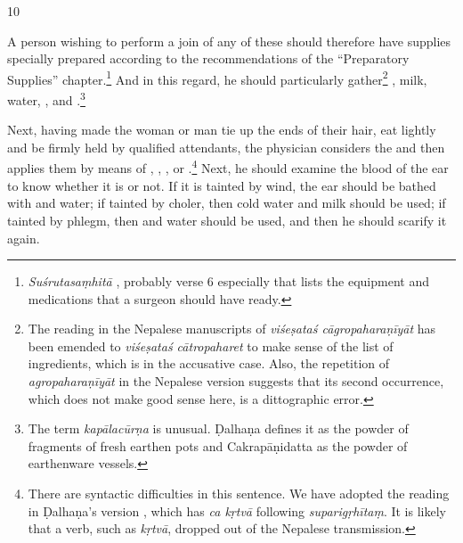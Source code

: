 \begin{translation}
\item[10]  
    
A person wishing to perform a join of any of these should therefore have supplies
specially prepared according to the recommendations of the “Preparatory Supplies”
chapter.\footnote{\emph{Suśrutasaṃhitā} , probably verse 6
    especially that lists the equipment and medications that a surgeon should have
    ready.}  And in this regard, he should particularly gather\footnote{The reading in
        the Nepalese manuscripts of \emph{viśeṣataś cāgropaharaṇīyāt} has been emended to
        \emph{viśeṣataś cātropaharet} to make sense of the list of ingredients, which is
        in the accusative case. Also, the repetition of \emph{agropaharaṇīyāt} in the
        Nepalese version suggests that its second occurrence, which does not make good
        sense here, is a dittographic error.} , milk,
        water, , and .\footnote{The term \emph{kapālacūrṇa} is unusual. Ḍalhaṇa
            \citep[79]{vulgate} defines it as the powder of fragments of fresh earthen pots
            and Cakrapāṇidatta \citep[129]{acar-1939} as the powder of earthenware vessels.}
    
Next, having made the woman or man tie up the ends of their hair, eat lightly and
be firmly held by qualified attendants, the physician considers the
 and then applies them by means of ,
, , or
.\footnote{There are syntactic difficulties in this
    sentence.  We have %
    adopted the reading in Ḍalhaṇa's version \citep[78]{vulgate}, which has
    \emph{ca kṛtvā} following \emph{suparigṛhītaṃ}. It is likely that a verb, such
    as \emph{kṛtvā}, dropped out of the Nepalese transmission.}  Next, he should
    examine the blood of the ear to know whether it is  or not.
    If it is tainted by wind, the ear should be bathed with
     and water; if tainted by choler, then
    cold water and milk should be used; if tainted by phlegm, then
     and water should be used, and then he should
    scarify it again.
       

\end{translation}
